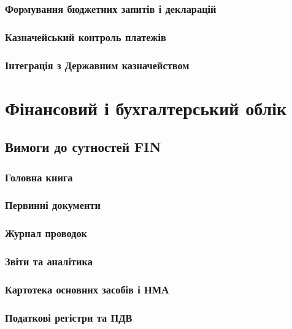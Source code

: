 \subsubsection{Формування бюджетних запитів і декларацій}

\subsubsection{Казначейський контроль платежів}

\subsubsection{Інтеграція з Державним казначейством}

\newpage
\section{Фінансовий і бухгалтерський облік}

\subsection{Вимоги до сутностей FIN}

\subsubsection{Головна книга}

\subsubsection{Первинні документи}

\subsubsection{Журнал проводок}

\subsubsection{Звіти та аналітика}

\subsubsection{Картотека основних засобів і НМА}

\subsubsection{Податкові регістри та ПДВ}

